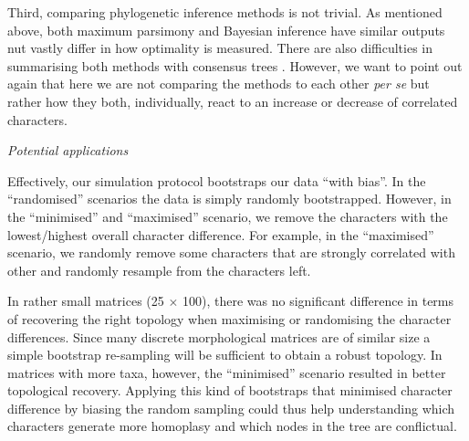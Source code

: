 \documentclass[12pt,letterpaper]{article}
\renewcommand{\subsection}[1]{%
\bigskip
\begin{center}
\begin{large}
\normalfont\itshape #1
\end{large}
\end{center}}
\begin{document}
Third, comparing phylogenetic inference methods is not trivial.
As mentioned above, both maximum parsimony and Bayesian inference
have similar outputs nut vastly differ in how optimality is measured.
There are also difficulties in summarising both methods with consensus trees \cite{oReilly2017efficacy}.
However, we want to point out again that here we are not comparing the methods to each other \textit{per se} but rather how they both, individually, react to an increase or decrease of correlated characters.

\subsection{Potential applications}
Effectively, our simulation protocol bootstraps our data ``with bias''.
In the ``randomised'' scenarios the data is simply randomly bootstrapped. %
However, in the ``minimised'' and ``maximised'' scenario, we remove the characters with the lowest/highest overall character difference.
For example, in the ``maximised'' scenario, we randomly remove some characters that are strongly correlated with other
 and randomly resample from the characters left.

In rather small matrices (25 $\times$ 100), there was no significant difference in terms of recovering the right topology when maximising or randomising the character differences.
Since many discrete morphological matrices are of similar size \citep{guillerme2016assessment} a simple bootstrap re-sampling
will be sufficient to obtain a robust topology.%
In matrices with more taxa, however, the ``minimised'' scenario resulted in better topological recovery.
Applying this kind of bootstraps that minimised character difference by biasing the random sampling could thus help understanding which characters generate more homoplasy and which nodes in the tree are conflictual.
\end{document}
